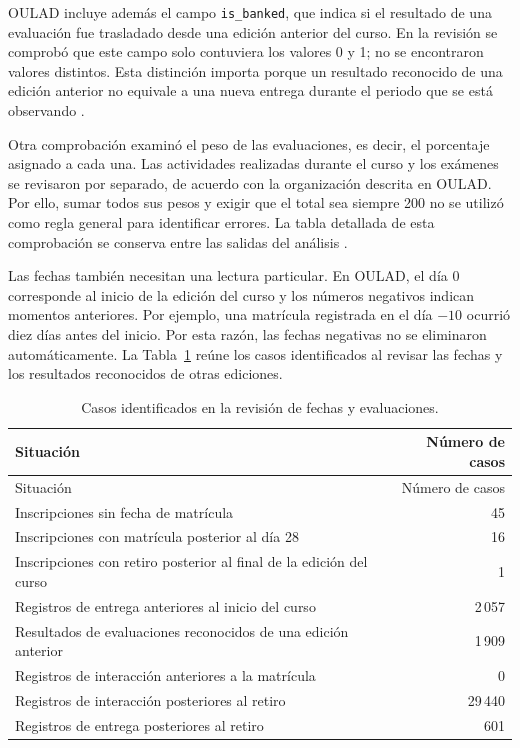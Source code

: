 OULAD incluye además el campo \texttt{is\_banked}, que indica si el resultado de una evaluación fue trasladado desde una edición anterior del curso. En la revisión se comprobó que este campo solo contuviera los valores 0 y 1; no se encontraron valores distintos. Esta distinción importa porque un resultado reconocido de una edición anterior no equivale a una nueva entrega durante el periodo que se está observando \cite{sdata2017171}.

Otra comprobación examinó el peso de las evaluaciones, es decir, el porcentaje asignado a cada una. Las actividades realizadas durante el curso y los exámenes se revisaron por separado, de acuerdo con la organización descrita en OULAD. Por ello, sumar todos sus pesos y exigir que el total sea siempre 200 no se utilizó como regla general para identificar errores. La tabla detallada de esta comprobación se conserva entre las salidas del análisis \cite{sdata2017171}.

Las fechas también necesitan una lectura particular. En OULAD, el día 0 corresponde al inicio de la edición del curso y los números negativos indican momentos anteriores. Por ejemplo, una matrícula registrada en el día $-10$ ocurrió diez días antes del inicio. Por esta razón, las fechas negativas no se eliminaron automáticamente. La Tabla~\ref{rev01:fechas} reúne los casos identificados al revisar las fechas y los resultados reconocidos de otras ediciones.

\begingroup\small\setlength{\tabcolsep}{3pt}\renewcommand{\arraystretch}{1.16}
\begin{longtable}{p{.78\linewidth}r}
\caption{Casos identificados en la revisión de fechas y evaluaciones.}\label{rev01:fechas}\\
\toprule
Situación & Número de casos \\
\midrule\endfirsthead
Situación & Número de casos \\
\midrule\endhead
\bottomrule\endfoot
Inscripciones sin fecha de matrícula & 45 \\
Inscripciones con matrícula posterior al día 28 & 16 \\
Inscripciones con retiro posterior al final de la edición del curso & 1 \\
Registros de entrega anteriores al inicio del curso & 2\,057 \\
Resultados de evaluaciones reconocidos de una edición anterior & 1\,909 \\
Registros de interacción anteriores a la matrícula & 0 \\
Registros de interacción posteriores al retiro & 29\,440 \\
Registros de entrega posteriores al retiro & 601 \\
\end{longtable}\endgroup

